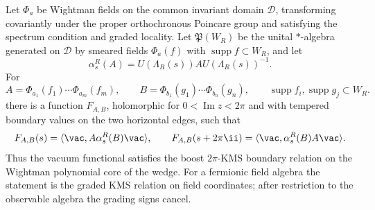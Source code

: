 \begin{theorem}
\label{thm:wightman-polynomial-wedge-kms}
Let \(\Phi_a\) be Wightman fields on the common invariant domain
\(\mathcal D\), transforming covariantly under the proper orthochronous
Poincare group and satisfying the spectrum condition and graded locality.  Let
\(\mathfrak P(W_R)\) be the unital \(*\)-algebra generated on \(\mathcal D\)
by smeared fields \(\Phi_a(f)\) with \(\operatorname{supp}f\subset W_R\), and
let
\[
  \alpha_s^R(A)=U(\Lambda_R(s))AU(\Lambda_R(s))^{-1}.
\]
For
\[
  A=\Phi_{a_1}(f_1)\cdots\Phi_{a_m}(f_m),
  \qquad
  B=\Phi_{b_1}(g_1)\cdots\Phi_{b_n}(g_n),
  \qquad
  \operatorname{supp}f_i,\operatorname{supp}g_j\subset W_R .
\]
there is a function \(F_{A,B}\), holomorphic for \(0<\operatorname{Im}z<2\pi\)
and with tempered boundary values on the two horizontal edges, such that
\begin{equation}
  F_{A,B}(s)=\langle\vac,A\alpha_s^R(B)\vac\rangle,
  \qquad
  F_{A,B}(s+2\pi\ii)=\langle\vac,\alpha_s^R(B)A\vac\rangle .
  \label{eq:wightman-polynomial-core-kms}
\end{equation}
Thus the vacuum functional satisfies the boost \(2\pi\)-KMS boundary relation
on the Wightman polynomial core of the wedge.  For a fermionic field algebra
the statement is the graded KMS relation on field coordinates; after
restriction to the observable algebra the grading signs cancel.
\end{theorem}

